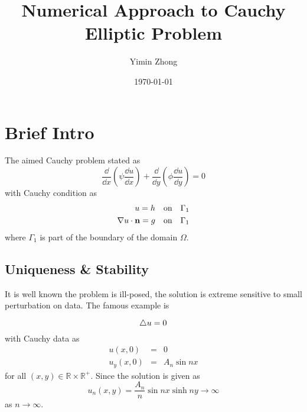 \documentclass{note}
\author{Yimin Zhong}
\title{Numerical Approach to Cauchy Elliptic Problem}
\date{\today}
\begin{document}
\maketitle
\section{Brief Intro}
The aimed Cauchy problem stated as
\begin{equation}
\frac{\dd}{\dd x}\left(\psi \frac{\dd u}{\dd x}\right) + \frac{\dd}{\dd y}\left(\phi \frac{\dd u}{\dd y}\right) = 0
\end{equation}
with Cauchy condition as
\begin{eqnarray}
u  = h \quad\mbox{on}\quad \Gamma_1 \\
\nabla u \cdot \mathbf{n} = g \quad\mbox{on}\quad \Gamma_1
\end{eqnarray}
where $\Gamma_1$ is part of the boundary of the domain $\Omega$.
\subsection{Uniqueness \& Stability}
It is well known the problem is ill-posed, the solution is extreme sensitive to small perturbation on data. The famous example is
\begin{example}
\begin{equation}
\triangle u = 0
\end{equation}
with Cauchy data as
\begin{eqnarray}
u(x,0) &=& 0 \\
u_y(x,0) &=& A_n\sin nx 
\end{eqnarray}
for all $(x,y)\in \mathbb{R}\times\mathbb{R^{+}}$. Since the solution is given as
\begin{equation}
u_n(x,y) = \frac{A_n}{n}\sin nx \sinh ny \to\infty 
\end{equation}
as $n\to \infty$.
\end{example}
\end{document}
